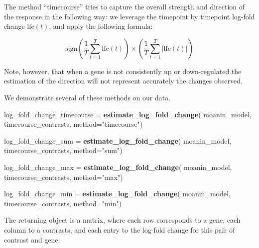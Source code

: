 \documentclass[9pt,a4paper,]{extarticle}
\newenvironment{Shaded}{\begin{snugshade}}{\end{snugshade}}
\newcommand{\DataTypeTok}[1]{\textcolor[rgb]{0.13,0.29,0.53}{#1}}
\newcommand{\KeywordTok}[1]{\textcolor[rgb]{0.13,0.29,0.53}{\textbf{#1}}}
\newcommand{\NormalTok}[1]{#1}
\newcommand{\StringTok}[1]{\textcolor[rgb]{0.31,0.60,0.02}{#1}}
\begin{document}
The method ``timecourse'' tries to capture the overall strength and direction of the response in the following way: we leverage the
timepoint by timepoint log-fold change \(\text{lfc}(t)\), and apply the
following formula:

\[\text{sign}\left(\frac{1}{T}\sum_{t = 1}^T \text{lfc}(t) \right) \times \left(\frac{1}{T}\sum_{t= 1}^T \lvert {\text{lfc}(t)} \lvert \right)\]

Note, however, that when a gene is not consistently up or down-regulated the estimation
of the direction will not represent accurately the changes observed.

We demonstrate several of these methods on our data.

\begin{Shaded}
\begin{Highlighting}[]
\NormalTok{log_fold_change_timecourse =}\StringTok{ }\KeywordTok{estimate_log_fold_change}\NormalTok{(}
\NormalTok{    moanin_model, timecourse_contrasts,  }\DataTypeTok{method=}\StringTok{"timecourse"}\NormalTok{)}

\NormalTok{log_fold_change_sum =}\StringTok{ }\KeywordTok{estimate_log_fold_change}\NormalTok{(}
\NormalTok{    moanin_model, timecourse_contrasts,  }\DataTypeTok{method=}\StringTok{"sum"}\NormalTok{)}

\NormalTok{log_fold_change_max =}\StringTok{ }\KeywordTok{estimate_log_fold_change}\NormalTok{(}
\NormalTok{    moanin_model, timecourse_contrasts, }\DataTypeTok{method=}\StringTok{"max"}\NormalTok{)}

\NormalTok{log_fold_change_min =}\StringTok{ }\KeywordTok{estimate_log_fold_change}\NormalTok{(}
\NormalTok{    moanin_model, timecourse_contrasts, }\DataTypeTok{method=}\StringTok{"min"}\NormalTok{)}
\end{Highlighting}
\end{Shaded}

The returning object is a matrix, where each row corresponds to a gene,
each column to a contrasts, and each entry to the log-fold change for this
pair of contrast and gene.
\end{document}
